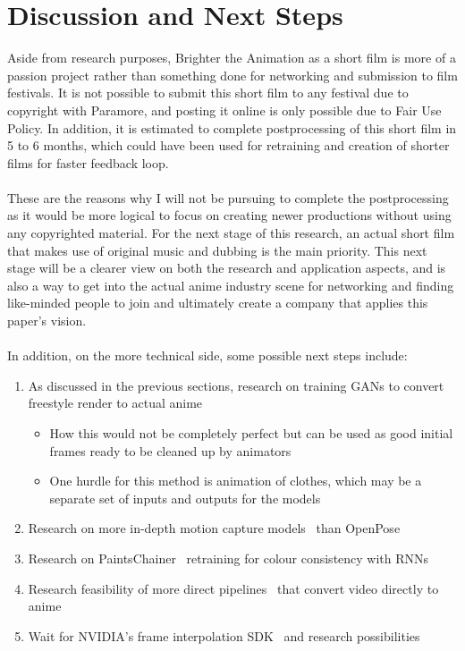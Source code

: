 \section{Discussion  and Next Steps}

Aside from research purposes, Brighter the Animation as a short film is more of a passion project rather than something done for networking and submission to film festivals. It is not possible to submit this short film to any festival due to copyright with Paramore, and posting it online is only possible due to Fair Use Policy. In addition, it is estimated to complete postprocessing of this short film in 5 to 6 months, which could have been used for retraining and creation of shorter films for faster feedback loop.\\\\
These are the reasons why I will not be pursuing to complete the postprocessing as it would be more logical to focus on creating newer productions without using any copyrighted material. For the next stage of this research, an actual short film that makes use of original music and dubbing is the main priority. This next stage will be a clearer view on both the research and application aspects, and is also a way to get into the actual anime industry scene for networking and finding like-minded people to join and ultimately create a company that applies this paper's vision.\\\\

In addition, on the more technical side, some possible next steps include:

\begin{enumerate}
    \item As discussed in the previous sections, research on training GANs to convert freestyle render to actual anime
        \begin{itemize}
            \item How this would not be completely perfect but can be used as good initial frames ready to be cleaned up by animators
            \item One hurdle for this method is animation of clothes, which may be a separate set of inputs and outputs for the models
        \end{itemize}
    \item Research on more in-depth motion capture models~\cite{everybodyDanceNow} than OpenPose~\cite{openposeArxiv}
    \item Research on PaintsChainer~\cite{paintsChainer} retraining for colour consistency with RNNs
    \item Research feasibility of more direct pipelines~\cite{makeGirlsMoe, fullBodyAnimeGeneration, vid2vid} that convert video directly to anime
    \item Wait for NVIDIA's frame interpolation SDK~\cite{nvidiaNGXTech} and research possibilities~\cite{superSlomo}
\end{enumerate}

